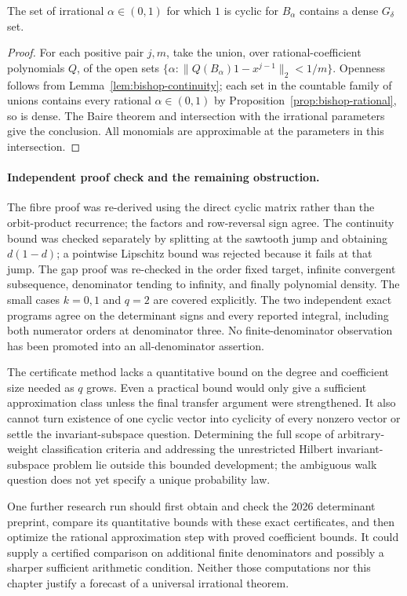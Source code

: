 \begin{corollary}\ours{}
The set of irrational \(\alpha\in(0,1)\) for which \(1\) is cyclic for
\(B_\alpha\) contains a dense \(G_\delta\) set.
\end{corollary}
\begin{proof}
For each positive pair \(j,m\), take the union, over rational-coefficient
polynomials \(Q\), of the open sets
\(\{\alpha:\|Q(B_\alpha)1-x^{j-1}\|_2<1/m\}\).
Openness follows from Lemma~\ref{lem:bishop-continuity}; each set in the
countable family of unions contains every rational \(\alpha\in(0,1)\)
by Proposition~\ref{prop:bishop-rational}, so is dense.  The Baire theorem
and intersection with the irrational parameters give the conclusion.
All monomials are approximable at the parameters in this intersection.
\end{proof}

\paragraph{Independent proof check and the remaining obstruction.}
The fibre proof was re-derived using the direct cyclic matrix rather than
the orbit-product recurrence; the factors and row-reversal sign agree.
The continuity bound was checked separately by splitting at the sawtooth
jump and obtaining \(d(1-d)\); a pointwise Lipschitz bound was rejected
because it fails at that jump.  The gap proof was re-checked in the order
fixed target, infinite convergent subsequence, denominator tending to
infinity, and finally polynomial density.  The small cases \(k=0,1\) and
\(q=2\) are covered explicitly.  The two independent exact programs agree
on the determinant signs and every reported integral, including both
numerator orders at denominator three.  No finite-denominator observation
has been promoted into an all-denominator assertion.

The certificate method lacks a quantitative bound on the degree and
coefficient size needed as \(q\) grows.  Even a practical bound would only
give a sufficient approximation class unless the final transfer argument
were strengthened.  It also cannot turn existence of one cyclic vector
into cyclicity of every nonzero vector or settle the invariant-subspace
question.  Determining the full scope of arbitrary-weight classification
criteria and addressing the unrestricted Hilbert invariant-subspace
problem lie outside this bounded development; the ambiguous walk question
does not yet specify a unique probability law.

One further research run should first obtain and check the 2026 determinant
preprint, compare its quantitative bounds with these exact certificates,
and then optimize the rational approximation step with proved coefficient
bounds.  It could supply a certified comparison on additional finite
denominators and possibly a sharper sufficient arithmetic condition.
Neither those computations nor this chapter justify a forecast of a
universal irrational theorem.
